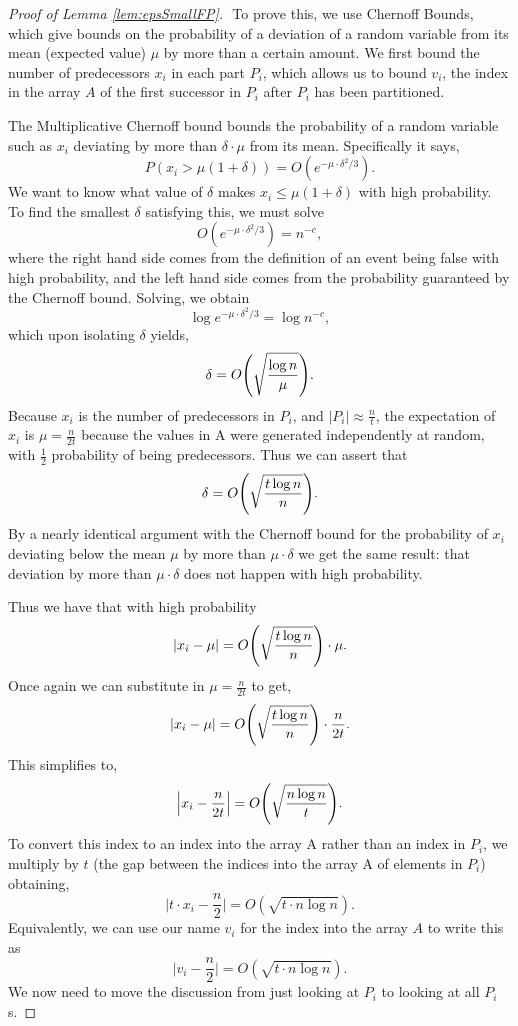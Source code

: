 \documentclass[twocolumn, twoside, 11pt]{article}
\DeclarePairedDelimiter{\paren}{(}{)}
\renewcommand{\paragraph}[1]{\vspace{0.09in}\noindent{\bf \boldmath #1.}}
\begin{document}
\begin{proof}[Proof of Lemma \ref{lem:epsSmallFP}]
$ $\newline
\paragraph{A Single $P_i$}
To prove this, we use Chernoff Bounds, which give bounds on the probability of a deviation of a random variable from its mean (expected value) $\mu$ by more than a certain amount.
We first bound the number of predecessors $x_i$ in each part $P_i$, which allows us to bound $v_i$, the index in the array $A$ of the first successor in $P_i$ after $P_i$ has been partitioned.

The Multiplicative Chernoff bound bounds the probability of a random variable such as $x_i$ deviating by more than $\delta \cdot \mu$ from its mean.
Specifically it says,
$$P(x_i>\mu(1+\delta)) = O(e^{-\mu \cdot \delta^2/3}).$$
We want to know what value of $\delta$ makes $x_i\leq\mu(1+\delta)$ with high probability.
To find the smallest $\delta$ satisfying this, we must solve 
$$O(e^{-\mu \cdot \delta^2/3}) = n^{-c},$$
where the right hand side comes from the definition of an event being false with high probability, and the left hand side comes from the probability guaranteed by the Chernoff bound.
Solving, we obtain 
$$\log e^{-\mu \cdot \delta^2/3} = \log n^{-c},$$
which upon isolating $\delta$ yields,
$$\delta = O\paren*{\sqrt{\frac{\log n}{\mu}}}.$$
Because $x_i$ is the number of predecessors in $P_i$, and $|P_i| \approx \frac{n}{t}$, the expectation of $x_i$ is $\mu = \frac{n}{2t}$ because the values in A were generated independently at random, with $\frac{1}{2}$ probability of being predecessors.
Thus we can assert that 
$$\delta = O\paren*{\sqrt{\frac{t\log n}{n}}}.$$
By a nearly identical argument with the Chernoff bound for the probability of $x_i$ deviating below the mean $\mu$ by more than $\mu \cdot \delta$ we get the same result: that deviation by more than $\mu \cdot \delta$ does not happen with high probability.

Thus we have that with high probability
$$|x_i - \mu| = O\paren*{\sqrt{\frac{t\log n}{n}}} \cdot \mu.$$
Once again we can substitute in $\mu=\frac{n}{2t}$ to get,
$$|x_i - \mu| = O\paren*{\sqrt{\frac{t\log n}{n}}} \cdot \frac{n}{2t}.$$
This simplifies to,
$$\Big|x_i - \frac{n}{2t}\Big| = O\paren*{\sqrt{\frac{n\log n}{t}}}.$$
To convert this index to an index into the array A rather than an index in $P_i$, we multiply by $t$ (the gap between the indices into the array A of elements in $P_i$) obtaining,
$$\Big|t\cdot x_i - \frac{n}{2}\Big| = O(\sqrt{t\cdot n\log n}).$$
Equivalently, we can use our name $v_i$ for the index into the array $A$ to write this as
$$\Big|v_i - \frac{n}{2}\Big| = O(\sqrt{t\cdot n\log n}).$$
We now need to move the discussion from just looking at $P_i$ to looking at all $P_i$s.


\end{proof}
\end{document}

